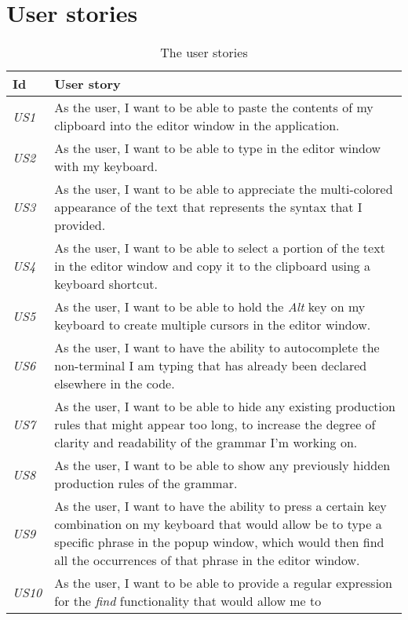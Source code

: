 \documentclass[english,engineering]{wizthesis}
\begin{document}
\section{User stories}

\begin{xltabular}{\textwidth}{@{}lX@{}}
  \caption{The user stories}
  \label{tab:user-stories}\\
  \toprule
  Id & User story \\* \midrule
  \endfirsthead
  \endhead
  \endfoot
  \endlastfoot
  \emph{US1} & As the user, I want to be able to paste the contents of my
  clipboard into the editor window in the application. \\
  \addlinespace[0.5em] \emph{US2} & As the user, I want to be able to type in
  the editor window with my keyboard. \\
  \addlinespace[0.5em] \emph{US3} & As the user, I want to be able to appreciate
  the multi-colored appearance of the text that represents the syntax that I
  provided. \\
  \addlinespace[0.5em] \emph{US4} & As the user, I want to be able to select a
  portion of the text in the editor window and copy it to the clipboard using a
  keyboard shortcut. \\
  \addlinespace[0.5em] \emph{US5} & As the user, I want to be able to hold the
  \emph{Alt} key on my keyboard to create multiple cursors in the editor window.
  \\
  \addlinespace[0.5em] \emph{US6} & As the user, I want to have the ability to
  autocomplete the non-terminal I am typing that has already been declared
  elsewhere in the code. \\
  \addlinespace[0.5em] \emph{US7} & As the user, I want to be able to hide any
  existing production rules that might appear too long, to increase the degree
  of clarity and readability of the grammar I'm working on. \\
  \addlinespace[0.5em] \emph{US8} & As the user, I want to be able to show any
  previously hidden production rules of the grammar. \\
  \addlinespace[0.5em] \emph{US9} & As the user, I want to have the ability to
  press a certain key combination on my keyboard that would allow be to type a
  specific phrase in the popup window, which would then find all the occurrences
  of that phrase in the editor window. \\
  \addlinespace[0.5em] \emph{US10} & As the user, I want to be able to provide a
  regular expression for the \emph{find} functionality that would allow me to

\end{xltabular}
\end{document}
